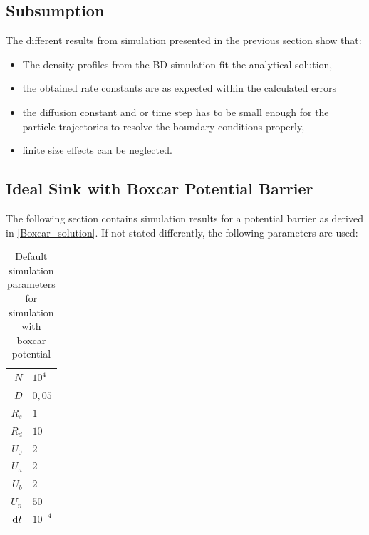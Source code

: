 \subsection{Subsumption}
The different results from simulation presented in the previous section show that:
\begin{itemize}
    \item The density profiles from the BD simulation fit the analytical solution,
    \item the obtained rate constants are as expected within the calculated errors
    \item   the diffusion constant and  or time step has to be small enough for the particle 
            trajectories to resolve the boundary conditions properly,
    \item finite size effects can be neglected.
\end{itemize}
\subsection{Ideal Sink with Boxcar Potential Barrier}
The following section contains simulation results for a potential barrier as derived in \eqref{Boxcar_solution}. If not stated differently, the following parameters are used:
\begin{table}[H]
    \centering
    \begin{tabular}{r|l}
        $N$ & $10^{4}$\\
        $D$ & $0,05$\\
        $R_s$ & $1$ \\
        $R_d$ & $10$ \\
        $U_0$ & $2$ \\
        $U_a$ & $2$ \\
        $U_b$ & $2$ \\
        $U_n$ & $50$ \\
        ${\rm d}t$ & $10^{-4}$
    \end{tabular}
    \caption{Default simulation parameters for simulation with boxcar potential}
    \label{tab:Parameters_cp}
\end{table}

